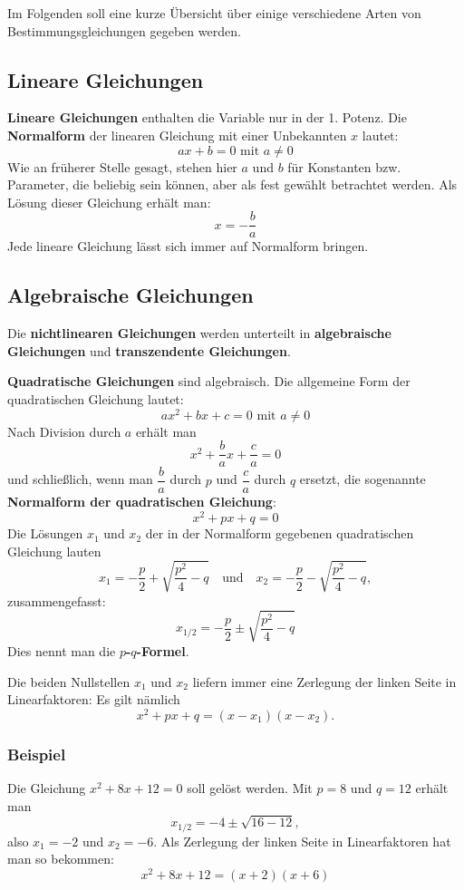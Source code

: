 Im Folgenden soll eine kurze Übersicht über einige verschiedene Arten von Bestimmungsgleichungen gegeben werden.

\subsection{Lineare Gleichungen}

\textbf{Lineare Gleichungen} enthalten die Variable nur in der 1. Potenz. Die \textbf{Normalform} der linearen Gleichung mit einer Unbekannten $x$ lautet:
\[ ax + b = 0 \text{ mit } a \neq 0 \]
Wie an früherer Stelle gesagt, stehen hier $a$ und $b$ für Konstanten bzw. Parameter, die beliebig sein können, aber als fest gewählt betrachtet werden. Als Lösung dieser Gleichung erhält man:
\[ x = -\frac{b}{a} \]
Jede lineare Gleichung lässt sich immer auf Normalform bringen.

\subsection{Algebraische Gleichungen}

Die \textbf{nichtlinearen Gleichungen} werden unterteilt in \textbf{algebraische Gleichungen} und \textbf{transzendente Gleichungen}.

\textbf{Quadratische Gleichungen} sind algebraisch. Die allgemeine Form der quadratischen Gleichung lautet:
\[ ax^2 + bx + c = 0 \text{ mit } a \neq 0 \]
Nach Division durch $a$ erhält man
\[ x^2 + \frac{b}{a}x + \frac{c}{a} = 0 \]
und schließlich, wenn man $\dfrac{b}{a}$ durch $p$ und $\dfrac{c}{a}$ durch $q$ ersetzt, die sogenannte \textbf{Normalform der quadratischen Gleichung}:
\[ x^2 + px + q = 0 \]
Die Lösungen $x_1$ und $x_2$ der in der Normalform gegebenen quadratischen Gleichung lauten
\[ x_1 = -\frac{p}{2} + \sqrt{\frac{p^2}{4} - q} \quad \text{und} \quad x_2 = -\frac{p}{2} - \sqrt{\frac{p^2}{4} - q} , \]
zusammengefasst:
\[ x_{1/2} = -\frac{p}{2} \pm \sqrt{\frac{p^2}{4} - q} \]
Dies nennt man die \textbf{$p$-$q$-Formel}.

Die beiden Nullstellen $x_1$ und $x_2$ liefern immer eine Zerlegung der linken Seite in Linearfaktoren: Es gilt nämlich
\[ x^2 + px + q = (x - x_1)(x - x_2) . \]

\subsubsection{Beispiel}

Die Gleichung $x^2 + 8x + 12 = 0$ soll gelöst werden. Mit $p = 8$ und $q = 12$ erhält man
\[ x_{1/2} = -4 \pm \sqrt{16 - 12} , \]
also $x_1 = -2$ und $x_2 = -6$. Als Zerlegung der linken Seite in Linearfaktoren hat man so bekommen:
\[ x^2 + 8x + 12 = (x+2)(x+6)\]\beispielende

